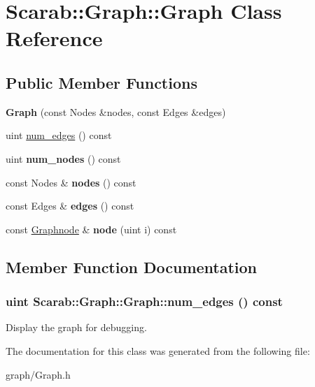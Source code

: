 \hypertarget{classScarab_1_1Graph_1_1Graph}{
\section{Scarab::Graph::Graph Class Reference}
\label{classScarab_1_1Graph_1_1Graph}
}
\subsection*{Public Member Functions}
\begin{DoxyCompactItemize}
\item 
\hypertarget{classScarab_1_1Graph_1_1Graph_ac753f9750341458516e06fb1437a1258}{
{\bfseries Graph} (const Nodes \&nodes, const Edges \&edges)}
\label{classScarab_1_1Graph_1_1Graph_ac753f9750341458516e06fb1437a1258}

\item 
uint \hyperlink{classScarab_1_1Graph_1_1Graph_afdfbdd8e5427a646707ceb22ca15d2e2}{num\_\-edges} () const 
\item 
\hypertarget{classScarab_1_1Graph_1_1Graph_ac35877b52ec1f625ff452a4073026b26}{
uint {\bfseries num\_\-nodes} () const }
\label{classScarab_1_1Graph_1_1Graph_ac35877b52ec1f625ff452a4073026b26}

\item 
\hypertarget{classScarab_1_1Graph_1_1Graph_a8d0c6189ef1569626348a30e908870e4}{
const Nodes \& {\bfseries nodes} () const }
\label{classScarab_1_1Graph_1_1Graph_a8d0c6189ef1569626348a30e908870e4}

\item 
\hypertarget{classScarab_1_1Graph_1_1Graph_a19a63be838e64b57e46cba029e273162}{
const Edges \& {\bfseries edges} () const }
\label{classScarab_1_1Graph_1_1Graph_a19a63be838e64b57e46cba029e273162}

\item 
\hypertarget{classScarab_1_1Graph_1_1Graph_af226b4907b00e178a8f7bd6e972e42d2}{
const \hyperlink{classScarab_1_1Graph_1_1Graphnode}{Graphnode} \& {\bfseries node} (uint i) const }
\label{classScarab_1_1Graph_1_1Graph_af226b4907b00e178a8f7bd6e972e42d2}

\end{DoxyCompactItemize}


\subsection{Member Function Documentation}
\hypertarget{classScarab_1_1Graph_1_1Graph_afdfbdd8e5427a646707ceb22ca15d2e2}{
\subsubsection[{num\_\-edges}]{\setlength{\rightskip}{0pt plus 5cm}uint Scarab::Graph::Graph::num\_\-edges () const}}
\label{classScarab_1_1Graph_1_1Graph_afdfbdd8e5427a646707ceb22ca15d2e2}
Display the graph for debugging. 

The documentation for this class was generated from the following file:\begin{DoxyCompactItemize}
\item 
graph/Graph.h\end{DoxyCompactItemize}
